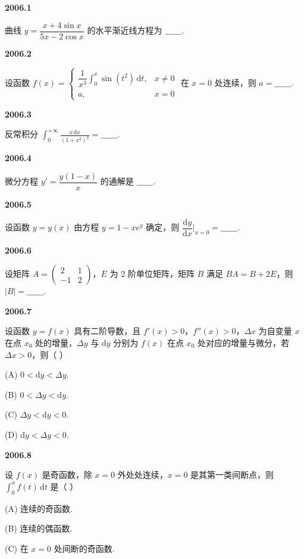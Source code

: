 \documentclass[UTF8,12pt,fontset=windows]{ctexart}
\begin{document}
{\large\bfseries 2006.1}

曲线 $y = \dfrac{x+4\sin x}{5x-2\cos x}$ 的水平渐近线方程为 $\_\_\_\_\_\_.$

\vfill
\newpage
{\large\bfseries 2006.2}

设函数 $f(x) = \begin{cases} \dfrac{1}{x^3}\displaystyle\int_0^x \sin(t^2)\,\mathrm{d}t, & x \neq 0 \\ a, & x = 0 \end{cases}$ 在 $x = 0$ 处连续，则 $a = \_\_\_\_\_\_.$

\vfill
\newpage
{\large\bfseries 2006.3}

反常积分 $\displaystyle\int_0^{+\infty}\frac{x\,\mathrm{d}x}{(1+x^2)^2} = \_\_\_\_\_\_.$

\vfill
\newpage
{\large\bfseries 2006.4}

微分方程 $y' = \dfrac{y(1-x)}{x}$ 的通解是 $\_\_\_\_\_\_.$

\vfill
\newpage
{\large\bfseries 2006.5}

设函数 $y = y(x)$ 由方程 $y = 1 - xe^y$ 确定，则 $\dfrac{\mathrm{d}y}{\mathrm{d}x}\Big|_{x=0} = \_\_\_\_\_\_.$

\vfill
\newpage
{\large\bfseries 2006.6}

设矩阵 $A = \begin{pmatrix} 2 & 1 \\ -1 & 2 \end{pmatrix}$，$E$ 为 2 阶单位矩阵，矩阵 $B$ 满足 $BA = B + 2E$，则 $|B| = \_\_\_\_\_\_.$

\vfill
\newpage
{\large\bfseries 2006.7}

设函数 $y = f(x)$ 具有二阶导数，且 $f'(x) > 0$，$f''(x) > 0$，$\Delta x$ 为自变量 $x$ 在点 $x_0$ 处的增量，$\Delta y$ 与 $\mathrm{d}y$ 分别为 $f(x)$ 在点 $x_0$ 处对应的增量与微分，若 $\Delta x > 0$，则（ ）

(A) $0 < \mathrm{d}y < \Delta y$.

(B) $0 < \Delta y < \mathrm{d}y$.

(C) $\Delta y < \mathrm{d}y < 0$.

(D) $\mathrm{d}y < \Delta y < 0$.

\vfill
\newpage
{\large\bfseries 2006.8}

设 $f(x)$ 是奇函数，除 $x = 0$ 外处处连续，$x = 0$ 是其第一类间断点，则 $\displaystyle\int_0^x f(t)\,\mathrm{d}t$ 是（ ）

(A) 连续的奇函数.

(B) 连续的偶函数.

(C) 在 $x = 0$ 处间断的奇函数.
\end{document}
